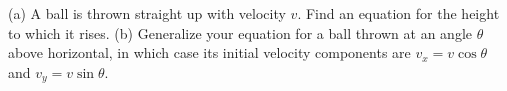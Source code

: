 (a) A ball is thrown straight up with velocity $v$. Find
an equation for the height to which it rises.\answercheck\hwendpart
(b) Generalize your equation for a ball thrown at an angle
$\theta $ above horizontal, in which case its initial
velocity components are $v_x=v \cos  \theta $ and
$v_y=v \sin  \theta $.\answercheck\hwendpart
